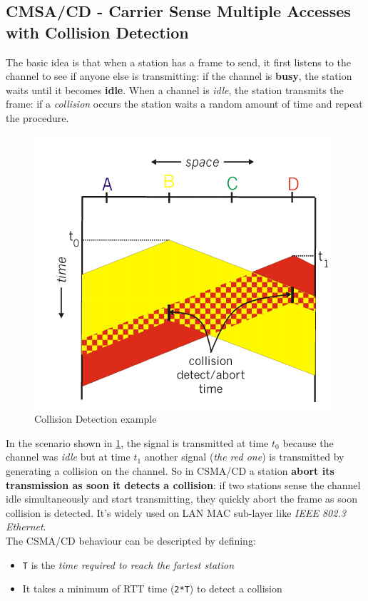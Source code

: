 \documentclass[10pt,a4paper]{report}
\theoremstyle{definition}
\begin{document}
\subsection{CMSA/CD - Carrier Sense Multiple Accesses with Collision Detection}\label{sec:cmsacd---carrier-sense-multiple-accesses-with-collision-detection}
The basic idea is that when a station has a frame to send, it first listens to the channel to see if anyone else is transmitting: if the channel is \textbf{busy}, the station waits until it becomes \textbf{idle}. When a channel is \textit{idle}, the station transmits the frame: if a \textit{collision} occurs the station waits a random amount of time and repeat the procedure.
\begin{figure}[h]
	\centering\includegraphics[scale=0.50]{images/Pasted image 20230224171228.png}
	\caption{Collision Detection example}
	\label{collision-schema}
\end{figure}

In the scenario shown in \ref{collision-schema}, the signal is transmitted at time $t_{0}$ because the channel was \textit{idle} but at time $t_{1}$ another signal (\textit{the red one}) is transmitted by generating a collision on the channel.
So in CSMA/CD a station \textbf{abort its transmission as soon it detects a collision}: if two stations sense the channel idle simultaneously and start transmitting, they quickly abort the frame as soon collision is detected. It's widely used on LAN MAC sub-layer like \textit{IEEE 802.3 Ethernet}.\\
The CSMA/CD behaviour can be descripted by defining:
\begin{itemize}
	\item 
	\texttt{T} is the \textit{time required to reach the fartest station}
	\item 
	It takes a minimum of RTT time (\texttt{2*T}) to detect a collision
	
\end{itemize}
\end{document}
